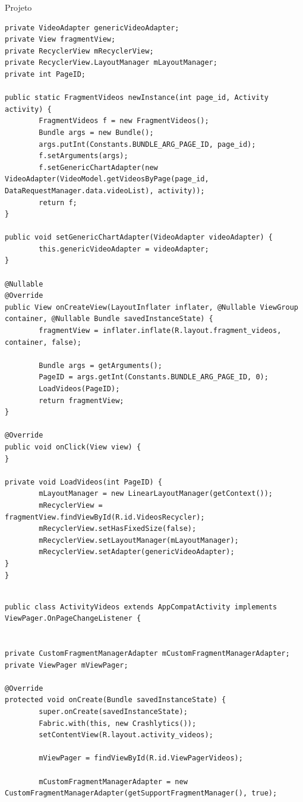 \documentclass[
	12pt,				%
	openright,			%
	twoside,			%
	a4paper,			%
	english,			%
	french,				%
	spanish,			%
	brazil				%
	]{abntex2}
\begin{document}
\begin{chapter}{Projeto}
\begin{lstlisting}[numbers=none,basicstyle=\small,
caption={FragmentVideos.java},
title={FragmentVideos.java},
label={FragmentVideos.java}]
private VideoAdapter genericVideoAdapter;
private View fragmentView;
private RecyclerView mRecyclerView;
private RecyclerView.LayoutManager mLayoutManager;
private int PageID;

public static FragmentVideos newInstance(int page_id, Activity activity) {
		FragmentVideos f = new FragmentVideos();
		Bundle args = new Bundle();
		args.putInt(Constants.BUNDLE_ARG_PAGE_ID, page_id);
		f.setArguments(args);
		f.setGenericChartAdapter(new VideoAdapter(VideoModel.getVideosByPage(page_id, DataRequestManager.data.videoList), activity));
		return f;
}

public void setGenericChartAdapter(VideoAdapter videoAdapter) {
		this.genericVideoAdapter = videoAdapter;
}

@Nullable
@Override
public View onCreateView(LayoutInflater inflater, @Nullable ViewGroup container, @Nullable Bundle savedInstanceState) {
		fragmentView = inflater.inflate(R.layout.fragment_videos, container, false);

		Bundle args = getArguments();
		PageID = args.getInt(Constants.BUNDLE_ARG_PAGE_ID, 0);
		LoadVideos(PageID);
		return fragmentView;
}

@Override
public void onClick(View view) {
}

private void LoadVideos(int PageID) {
		mLayoutManager = new LinearLayoutManager(getContext());
		mRecyclerView = fragmentView.findViewById(R.id.VideosRecycler);
		mRecyclerView.setHasFixedSize(false);
		mRecyclerView.setLayoutManager(mLayoutManager);
		mRecyclerView.setAdapter(genericVideoAdapter);
}
}

\end{lstlisting}

\begin{lstlisting}[numbers=none,basicstyle=\small,
caption={ActivityVideos.java},
title={ActivityVideos.java},
label={ActivityVideos.java}]

public class ActivityVideos extends AppCompatActivity implements ViewPager.OnPageChangeListener {


private CustomFragmentManagerAdapter mCustomFragmentManagerAdapter;
private ViewPager mViewPager;

@Override
protected void onCreate(Bundle savedInstanceState) {
		super.onCreate(savedInstanceState);
		Fabric.with(this, new Crashlytics());
		setContentView(R.layout.activity_videos);

		mViewPager = findViewById(R.id.ViewPagerVideos);

		mCustomFragmentManagerAdapter = new CustomFragmentManagerAdapter(getSupportFragmentManager(), true);


\end{lstlisting}
\end{chapter}
\end{document}
